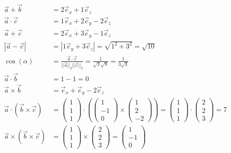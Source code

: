 \begin{solution}
	\begin{align}
	\vec a + \vec b &= 2 \vec e_x + 1 \vec e_z\\
	\vec a \cdot \vec c &= 1 \vec e_x + 2 \vec e_y - 2 \vec e_z\\
	\vec a + \vec c &= 2 \vec e_x + 3 \vec e_y - 1 \vec e_z\\
	|\vec a - \vec c | &= |1 \vec e_y + 3 \vec e_z | = \sqrt{1^2 + 3^2} = \sqrt{10}\\
	\cos(\alpha) &= \frac{\vec a \cdot \vec c}{||\vec a ||_2 ||\vec c||_2}= \frac{1}{\sqrt{3}\sqrt{9}}=\frac{1}{3 \sqrt{3}}\\
	\vec a \cdot \vec b &= 1  - 1 = 0\\
	\vec a \times \vec b &= \vec e_x + \vec e_y - 2 \vec e_z \\
	\vec a \cdot ( \vec b \times \vec c ) &= \left ( \begin{array}{c}1\\1\\1 \end{array} \right ) \cdot \left ( \left ( \begin{array}{c}1\\-1\\0 \end{array} \right ) \times \left ( \begin{array}{c}1\\2\\-2 \end{array} \right ) \right ) = \left ( \begin{array}{c}1\\1\\1 \end{array} \right ) \cdot \left ( \begin{array}{c}2\\2\\3 \end{array} \right ) = 7\\
	\vec a \times ( \vec b \times \vec c) &= \left ( \begin{array}{c}1\\1\\1 \end{array} \right ) \times \left ( \begin{array}{c}2\\2\\3 \end{array} \right ) = \left ( \begin{array}{c}1\\-1\\0 \end{array} \right )\\

\end{align}
\end{solution}
